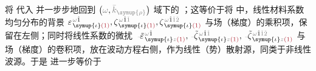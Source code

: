 将  代入  并一步步地回到 $\left( \mathcolor{gray}{\omega}, \mathcolor{gray}{\bar{k}_{\symup{\rho}}} \right)$ 域下的 ；这等价于将  中，线性材料系数均匀分布的背景 $\varepsilon^{\;\! \mathcolor{gray}{\omega} \hat{1}}_{\;\! \symup{\iota} \textcolor{Maroon}{(1)}}, \zeta^{\;\! \mathcolor{gray}{\omega} \hat{1} \mathcolor{gray}{\check{1}}}_{\;\! \symup{\iota} \textcolor{Maroon}{(1)}}, \zeta^{\;\! \mathcolor{gray}{\omega} \hat{1} \mathcolor{gray}{\check{1} \check{2}}}_{\;\! \symup{\iota} \textcolor{Maroon}{(1)}}$ 与场（梯度）的乘积项，保留在左侧；同时将线性系数的微扰 $\Xint{\begin{smallmatrix} ~ \\ {}^{}_{\mathcolor{gray}{-}} \\ ~ \end{smallmatrix}}{16}{\tilde{\varepsilon}}^{\;\! \mathcolor{gray}{\omega} \hat{1}}_{\;\! \symup{\iota} \mathcolor{gray}{z} \textcolor{Maroon}{(1)}}, \Xint{\begin{smallmatrix} ~ \\ {}^{}_{\mathcolor{gray}{-}} \\ ~ \end{smallmatrix}}{12}{\tilde{\zeta}}^{\;\! \mathcolor{gray}{\omega} \hat{1} \mathcolor{gray}{\check{1}}}_{\;\! \symup{\iota} \mathcolor{gray}{z} \textcolor{Maroon}{(1)}}, \Xint{\begin{smallmatrix} ~ \\ {}^{}_{\mathcolor{gray}{-}} \\ ~ \end{smallmatrix}}{12}{\tilde{\zeta}}^{\;\! \mathcolor{gray}{\omega} \hat{1} \mathcolor{gray}{\check{1} \check{2}}}_{\;\! \symup{\iota} \mathcolor{gray}{z} \textcolor{Maroon}{(1)}}$ 与场（梯度）的卷积项，放在波动方程右侧，作为线性（势）散射源\cite{bornPrinciplesOptics60th2019,gerkeAperiodicVolumeOptics2010}，同类于非线性波源。于是  进一步等价于
